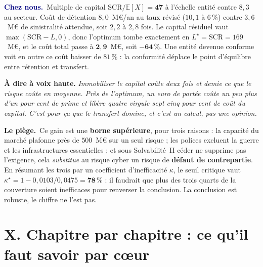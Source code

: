 \documentclass[11pt,a4paper]{article}
\providecommand{\E}{\mathbb{E}}
\newcommand{\cheznous}[1]{\smallskip\noindent\textcolor{navy}{\textbf{Chez nous.}}\ #1\par}
\newcommand{\lepiege}[1]{\smallskip\noindent\textcolor{accent}{\textbf{Le piège.}}\ #1\par}
\newcommand{\laphrase}[1]{\begin{phrasebox}\textbf{À dire à voix haute.} \emph{#1}\end{phrasebox}}
\begin{document}
\cheznous{Multiple de capital $\mathrm{SCR}/\E[X]=\mathbf{47}$ à l'échelle entité contre $8{,}3$
au secteur. Coût de détention $8{,}0$~M\euro/an au taux révisé ($10{,}1$ à $6\,\%$) contre
$3{,}6$~M\euro{} de sinistralité attendue, soit $2{,}2$ à $2{,}8$ fois. Le capital résiduel vaut
$\max(\mathrm{SCR}-L,0)$, donc l'optimum tombe exactement en $L^\star=\mathrm{SCR}=169$~M\euro, et
le coût total passe à $\mathbf{2{,}9}$~M\euro, soit $\mathbf{-64\,\%}$. Une entité devenue conforme
voit en outre ce coût baisser de $81\,\%$ : la conformité déplace le point d'équilibre entre
rétention et transfert.}

\laphrase{Immobiliser le capital coûte deux fois et demie ce que le risque coûte en moyenne.
Près de l'optimum, un euro de portée coûte un peu plus d'un pour cent de prime et libère
quatre virgule sept cinq pour cent de coût du capital. C'est pour ça que le transfert domine, et
c'est un calcul, pas une opinion.}

\lepiege{Ce gain est une \textbf{borne supérieure}, pour trois raisons : la capacité du marché
plafonne près de $500$~M\euro{} sur un seul risque ; les polices excluent la guerre et les
infrastructures essentielles ; et sous Solvabilité~II céder ne supprime pas l'exigence, cela
\emph{substitue} au risque cyber un risque de \textbf{défaut de contrepartie}. En résumant les
trois par un coefficient d'inefficacité $\kappa$, le seuil critique vaut
$\kappa^\star=1-0{,}0103/0{,}0475=\mathbf{78\,\%}$ : il faudrait que plus des trois quarts de la
couverture soient inefficaces pour renverser la conclusion. La conclusion est robuste, le
chiffre ne l'est pas.}

\newpage
\part*{X. Chapitre par chapitre : ce qu'il faut savoir par c\oe ur}
\end{document}
